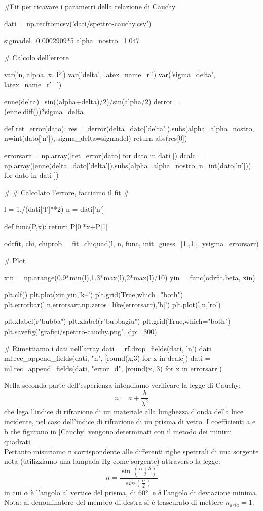 \begin{sagesilent}
#Fit per ricavare i parametri della relazione di Cauchy

dati = np.recfromcsv('dati/spettro-cauchy.csv')

sigmadel=0.0002909*5
alpha_nostro=1.047

# Calcolo dell'errore

var('n, alpha, x, P')
var('delta', latex_name=r'\delta')
var('sigma_delta', latex_name=r'\sigma_{\delta}')

enne(delta)=sin((alpha+delta)/2)/sin(alpha/2)
derror = (enne.diff())*sigma_delta

def ret_error(dato):
  res = derror(delta=dato['delta']).subs(alpha=alpha_nostro, n=int(dato['n']), sigma_delta=sigmadel)
  return abs(res[0])

errorsarr = np.array([ret_error(dato) for dato in dati ])
dcalc = np.array([enne(delta=dato['delta']).subs(alpha=alpha_nostro, n=int(dato['n'])) for dato in dati ])

#
# Calcolato l'errore, facciamo il fit
#

l = 1./(dati['l']**2)
n = dati['n']

def func(P,x):
    return P[0]*x+P[1]

odrfit, chi, chiprob = fit_chiquad(l, n, func, init_guess=[1.,1.], ysigma=errorsarr)


# Plot

xin = np.arange(0.9*min(l),1.3*max(l),2*max(l)/10)
yin = func(odrfit.beta, xin)

plt.clf()
plt.plot(xin,yin,'k--')
plt.grid(True,which="both")
plt.errorbar(l,n,errorsarr,np.zeros_like(errorsarr),'b|')
plt.plot(l,n,'ro')

plt.xlabel(r"bubba")
plt.xlabel(r"bubbagiu")
plt.grid(True,which="both")
plt.savefig("grafici/spettro-cauchy.png", dpi=300)

# Rimettiamo i dati nell'array
dati = rf.drop_fields(dati, 'n')
dati = ml.rec_append_fields(dati, "n", [round(x,3) for x in dcalc])
dati = ml.rec_append_fields(dati, "error_d", [round(x, 3) for x in errorsarr])
\end{sagesilent}

Nella seconda parte dell'esperienza intendiamo verificare la legge di Cauchy:
\begin{equation}
n = a + \frac{b}{\lambda^2}
\label{Cauchy}
\end{equation}
che lega l'indice di rifrazione di un materiale alla lunghezza d'onda della luce incidente, nel caso dell'indice di rifrazione di un prisma di vetro.
I coefficienti a e b che figurano in \ref{Cauchy} vengono determinati con il metodo dei minimi quadrati. \\
Pertanto misuriamo n corrispondente alle differenti righe spettrali di una sorgente nota (utilizziamo una lampada Hg come sorgente) attraverso la legge:
\begin{equation}
n = \frac{\sin(\frac{\alpha + \delta}{2})}{sin(\frac{\alpha}{2})}
\label{n}
\end{equation}
in cui $\alpha$ è l'angolo al vertice del prisma, di $60°$, e $\delta$ l'angolo di deviazione minima. Nota: al denominatore del membro di destra si è trascurato di mettere $n_{aria}=1$.\\


